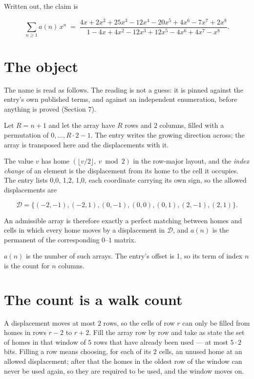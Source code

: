 \documentclass[11pt]{article}
\theoremstyle{definition}
\begin{document}
Written out, the claim is

\[\sum_{n \ge 1} a(n)\,x^n \;=\; \frac{4x + 2x^{2} + 25x^{3} - 12x^{4} - 20x^{5} + 4x^{6} - 7x^{7} + 2x^{8}}{1 - 4x + 4x^{2} - 12x^{3} + 12x^{5} - 4x^{6} + 4x^{7} - x^{8}}.\]

\section{The object}

The name is read as follows. The reading is not a guess: it is pinned against the entry's own published terms, and against an independent enumeration, before anything is proved (Section 7).

Let $R = n + 1$ and let the array have $R$ rows and $2$ columns, filled with a permutation of $0,\dots,R\cdot2-1$. The entry writes the growing direction across; the array is transposed here and the displacements with it.

The value $v$ has home $(\lfloor v/2\rfloor,\ v \bmod 2)$ in the row-major layout, and the {\itshape index change} of an element is the displacement from its home to the cell it occupies. The entry lists 0,0, 1,2, 1,0, each coordinate carrying its own sign, so the allowed displacements are

\[\mathcal{D} = \{(-2,-1), (-2,1), (0,-1), (0,0), (0,1), (2,-1), (2,1)\}.\]

An admissible array is therefore exactly a perfect matching between homes and cells in which every home moves by a displacement in $\mathcal{D}$, and $a(n)$ is the permanent of the corresponding $0$--$1$ matrix.

$a(n)$ is the number of such arrays. The entry's offset is 1, so its term of index $n$ is the count for $n$ columns.

\section{The count is a walk count}

A displacement moves at most $2$ rows, so the cells of row $r$ can only be filled from homes in rows $r-2$ to $r+2$. Fill the array row by row and take as state the set of homes in that window of $5$ rows that have already been used --- at most $5\cdot2$ bits. Filling a row means choosing, for each of its $2$ cells, an unused home at an allowed displacement; after that the homes in the oldest row of the window can never be used again, so they are required to be used, and the window moves on.
\end{document}
